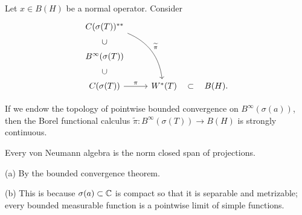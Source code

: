\documentclass{../../large}
\begin{document}
\begin{prb}
Let $x\in B(H)$ be a normal operator.
Consider
\[\begin{tikzcd}
C(\sigma(T))^{**} \ar[bend left]{rdd}{\tilde\pi}&&\\
B^\infty(\sigma(T))\uar[phantom,sloped,"\subset"]&&\\
C(\sigma(T)) \ar{r}{\pi}\uar[phantom,sloped,"\subset"] & W^*(T)\rar[phantom,"\subset"]& B(H).
\end{tikzcd}\]
\begin{parts}
\item If we endow the topology of pointwise bounded convergence on $B^\infty(\sigma(a))$, then the Borel functional calculus $\tilde\pi:B^\infty(\sigma(T))\to B(H)$ is strongly continuous.
\item Every von Neumann algebra is the norm closed span of projections.
\end{parts}
\end{prb}
\begin{pf}
(a)
By the bounded convergence theorem.

(b)
This is because $\sigma(a)\subset\mathbb{C}$ is compact so that it is separable and metrizable; every bounded measurable function is a pointwise limit of simple functions.
\end{pf}
\end{document}
